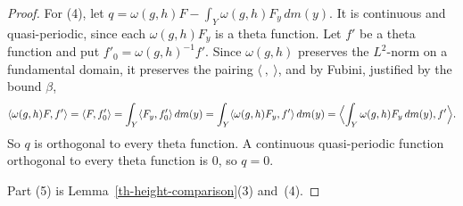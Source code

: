 \begin{proof}
For (4), let $q=\omega(g,h)F-\int_Y\omega(g,h)F_y\,dm(y)$. It is continuous and
quasi-periodic, since each $\omega(g,h)F_y$ is a theta function. Let $f'$ be a
theta function and put $f'_0=\omega(g,h)^{-1}f'$. Since $\omega(g,h)$ preserves
the $L^2$-norm on a fundamental domain, it preserves the pairing
$\langle\ ,\ \rangle$, and by Fubini, justified by the bound $\beta$,
\[
\langle\omega(g,h)F,f'\rangle=\langle F,f'_0\rangle=\int_Y\langle F_y,f'_0\rangle\,dm(y)
=\int_Y\langle\omega(g,h)F_y,f'\rangle\,dm(y)=\Bigl\langle\int_Y\omega(g,h)F_y\,dm(y),f'\Bigr\rangle .
\]
So $q$ is orthogonal to every theta function. A continuous quasi-periodic
function orthogonal to every theta function is $0$, so $q=0$.

Part (5) is Lemma~\ref{th-height-comparison}(3) and~(4).
\end{proof}

